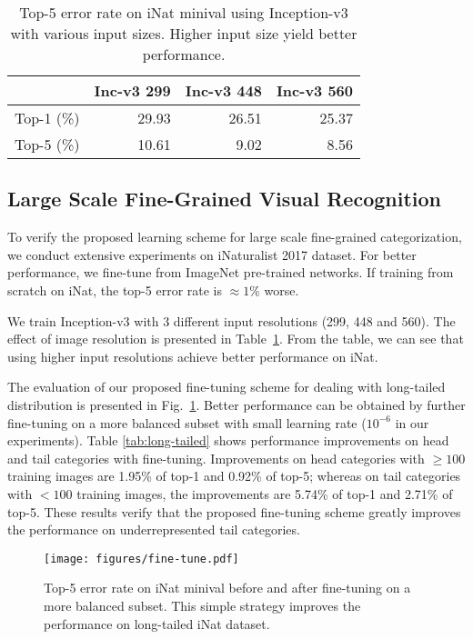 \documentclass[10pt,twocolumn,letterpaper]{article}
\begin{document}
\begin{table}[t]
\small
\begin{center}
\begin{tabular}{ l|r|r|r }
\hline
& \textbf{Inc-v3 299} & \textbf{Inc-v3 448} & \textbf{Inc-v3 560} \\ \hline
Top-1 (\%) & 29.93 & 26.51 & 25.37 \\
Top-5 (\%) & 10.61 & 9.02 & 8.56 \\ \hline
\end{tabular}
\end{center}
\caption{Top-5 error rate on iNat minival using Inception-v3 with various input sizes. Higher input size yield better performance.}
\label{tab:input_size}
\end{table}


\subsection{Large Scale Fine-Grained Visual Recognition}
\label{sec:exp_inat}

To verify the proposed learning scheme for large scale fine-grained categorization, we conduct extensive experiments on iNaturalist 2017 dataset.
For better performance, we fine-tune from ImageNet pre-trained networks.
If training from scratch on iNat, the top-5 error rate is $\approx 1\%$ worse.

We train Inception-v3 with 3 different input resolutions (299, 448 and 560).
The effect of image resolution is presented in Table~\ref{tab:input_size}.
From the table, we can see that using higher input resolutions achieve better performance on iNat.


The evaluation of our proposed fine-tuning scheme for dealing with long-tailed distribution is presented in Fig.\ \ref{fig:fine_tune}.
Better performance can be obtained by further fine-tuning on a more balanced subset with small learning rate ($10^{-6}$ in our experiments).
Table \ref{tab:long-tailed} shows performance improvements on head and tail categories with fine-tuning.
Improvements on head categories with $\geq 100$ training images are 1.95\% of top-1 and 0.92\% of top-5; whereas on tail categories with $< 100$ training images, the improvements are 5.74\% of top-1 and 2.71\% of top-5.
These results verify that the proposed fine-tuning scheme greatly improves the performance on underrepresented tail categories. 



\begin{figure}[t]
\centering
\texttt{[image: figures/fine-tune.pdf]}
\caption{Top-5 error rate on iNat minival before and after fine-tuning on a more balanced subset.
This simple strategy improves the performance on long-tailed iNat dataset.}
\label{fig:fine_tune}
\end{figure}
\end{document}
